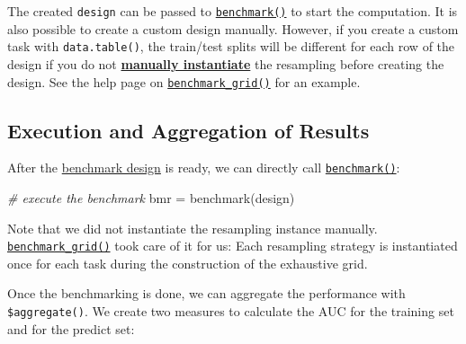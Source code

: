 \documentclass[
]{scrbook}
\newenvironment{Shaded}{\begin{snugshade}}{\end{snugshade}}
\newcommand{\AttributeTok}[1]{\textcolor[rgb]{0.77,0.63,0.00}{#1}}
\newcommand{\CommentTok}[1]{\textcolor[rgb]{0.56,0.35,0.01}{\textit{#1}}}
\newcommand{\FunctionTok}[1]{\textcolor[rgb]{0.00,0.00,0.00}{#1}}
\newcommand{\NormalTok}[1]{#1}
\newcommand{\OtherTok}[1]{\textcolor[rgb]{0.56,0.35,0.01}{#1}}
\newcommand{\SpecialCharTok}[1]{\textcolor[rgb]{0.00,0.00,0.00}{#1}}
\newcommand{\StringTok}[1]{\textcolor[rgb]{0.31,0.60,0.02}{#1}}
\renewenvironment{Shaded} {\begin{snugshade}\small} {\end{snugshade}}
\begin{document}
The created \texttt{design} can be passed to \href{https://mlr3.mlr-org.com/reference/benchmark.html}{\texttt{benchmark()}} to start the computation.
It is also possible to create a custom design manually.
However, if you create a custom task with \texttt{data.table()}, the train/test splits will be different for each row of the design if you do not \protect\hyperlink{resampling-inst}{\textbf{manually instantiate}} the resampling before creating the design.
See the help page on \href{https://mlr3.mlr-org.com/reference/benchmark_grid.html}{\texttt{benchmark\_grid()}} for an example.

\hypertarget{bm-exec}{%
\subsection{Execution and Aggregation of Results}\label{bm-exec}}

After the \protect\hyperlink{bm-design}{benchmark design} is ready, we can directly call \href{https://mlr3.mlr-org.com/reference/benchmark.html}{\texttt{benchmark()}}:

\begin{Shaded}
\begin{Highlighting}[]
\CommentTok{\# execute the benchmark}
\NormalTok{bmr }\OtherTok{=} \FunctionTok{benchmark}\NormalTok{(design)}
\end{Highlighting}
\end{Shaded}

Note that we did not instantiate the resampling instance manually.
\href{https://mlr3.mlr-org.com/reference/benchmark_grid.html}{\texttt{benchmark\_grid()}} took care of it for us:
Each resampling strategy is instantiated once for each task during the construction of the exhaustive grid.

Once the benchmarking is done, we can aggregate the performance with \texttt{\$aggregate()}.
We create two measures to calculate the AUC for the training set and for the predict set:

\begin{Shaded}
\end{Shaded}
\end{document}
